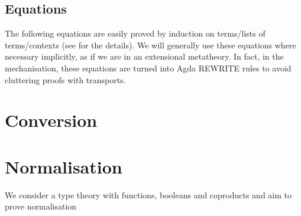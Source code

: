 \documentclass[
    a4paper, %
    fontsize=11pt, %
    twoside=false, %
	numbers=noenddot, %
	fontmethod=tex, %
]{kaobook}
\newcommand{\Conid}[1]{\mathit{#1}}
\newcommand{\Varid}[1]{\mathit{#1}}
\def\resethooks{%
  \global\let\SaveRestoreHook\empty
  \global\let\ColumnHook\empty}
\newlength{\blanklineskip}
\renewcommand\Varid[1]{\mathord{\textsf{#1}}}
\let\Conid\Varid
\begin{document}
\resethooks

\subsection{Equations}

The following equations are easily proved by induction on terms/lists of 
terms/contexts (see  for the details). 
We will generally use these equations where necessary implicitly, as if we are
in an extensional metatheory. In fact, in the mechanisation, these equations
are turned into Agda REWRITE rules to avoid cluttering proofs with transports.

\section{Conversion}

\section{Normalisation}

We consider a type theory with functions, booleans
and coproducts and aim to prove normalisation
\end{document}
